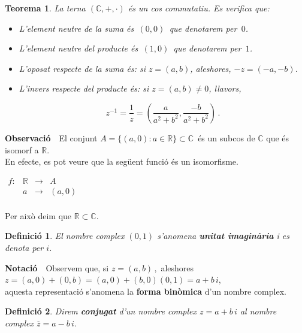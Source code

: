 \documentclass[12pt]{article}
\newcommand{\notacio}{\textbf{Notaci{\'o}}\ \ }
\newcommand{\observacio}{\textbf{Observaci{\'o}}\ \ }
\newtheorem{definicio}{Definici{\'o}}[subsection]
\newtheorem{teorema}{Teorema}[subsection]
\newcommand{\R}{\mathbb{R}}
\newcommand{\C}{\mathbb{C}}
\begin{document}
\begin{teorema}

 La terna $(\C,+,\cdot)$ \'{e}s un cos commutatiu. Es verifica que:
\begin{itemize}
    \item L'element neutre de la suma \'{e}s $\,(0,0)\,$ que denotarem
    per $\,0$.
    \item L'element neutre del producte \'{e}s $\,(1,0)\,$ que
    denotarem per $\,1$.
    \item L'oposat respecte de la suma \'{e}s: si $z=(a,b)$, aleshores, $-z=(-a,-b)$.
    \item L'invers respecte del producte \'{e}s: si $z=(a,b)\not =0$, llavors,

$$z^{-1}=\displaystyle\frac{1}{z}=\left(\frac{a}{a^2+b^2},\frac{-b}{a^2+b^2}\right)\,.$$
 \end{itemize}

 \end{teorema}

\observacio El conjunt $A=\{(a,0): a\in \R\}\subset\C\,$ \'{e}s un
subcos de $\C$ que \'{e}s isomorf a $\R$.\\

En efecte, es pot veure que la seg{\"u}ent funci{\'o} {\'e}s un isomorfisme.

\begin{center}
$\begin{array}{cccc}
  f: & \R & \longrightarrow & A \\
   & a & \longrightarrow & (a,0)\\
\end{array}$
\end{center}
Per aix\`{o} deim que $\R \subset \C$.

\begin{definicio}

El nombre complex $(0,1)$ s'anomena \textbf{unitat imagin{\`a}ria}
i es denota per $i$.
\end{definicio}

\notacio  Observem que, si $z=(a,b)\,,$ aleshores\\

\hspace{1.5cm}$z=(a,0)+(0,b)=(a,0)+(b,0)(0,1)=a+b\,i$,\\

aquesta representaci{\'o} s'anomena la \textbf{forma bin{\`o}mica}
d'un nombre complex.

\begin{definicio}

Direm\textbf{ conjugat} d'un nombre complex $z=a+b\,i$ al nombre
complex $\overline{z}=a-b\,i.$
\end{definicio}
\end{document}
